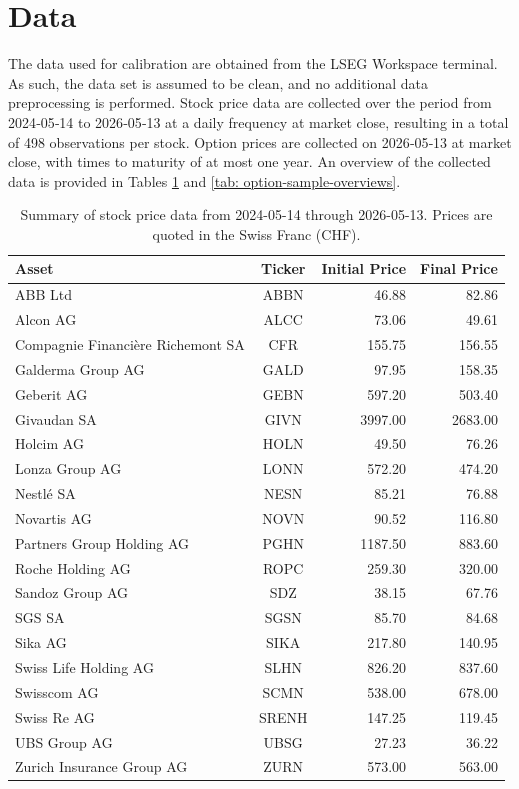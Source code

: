 \section{Data}
\label{appendix: Data}
The data used for calibration are obtained from the LSEG Workspace terminal. As such, the data set is assumed to be clean, and no additional data preprocessing is performed. Stock price data are collected over the period from 2024‑05‑14 to 2026‑05‑13 at a daily frequency at market close, resulting in a total of 498 observations per stock. Option prices are collected on 2026‑05‑13 at market close, with times to maturity of at most one year. An overview of the collected data is provided in Tables \ref{tab: stock data} and \ref{tab: option-sample-overviews}.

\begin{table}[h]
    \centering
    \begin{tabular}{lcrr}
        \toprule
        Asset & Ticker & Initial Price & Final Price \\
        \midrule
        ABB Ltd & ABBN & 46.88 & 82.86 \\
        Alcon AG & ALCC & 73.06 & 49.61 \\
        Compagnie Financière Richemont SA & CFR & 155.75 & 156.55 \\
        Galderma Group AG & GALD & 97.95 & 158.35 \\
        Geberit AG & GEBN & 597.20 & 503.40 \\
        Givaudan SA & GIVN & 3997.00 & 2683.00 \\
        Holcim AG & HOLN & 49.50 & 76.26 \\
        Lonza Group AG & LONN & 572.20 & 474.20 \\
        Nestlé SA & NESN & 85.21 & 76.88 \\
        Novartis AG & NOVN & 90.52 & 116.80 \\
        Partners Group Holding AG & PGHN & 1187.50 & 883.60 \\
        Roche Holding AG & ROPC & 259.30 & 320.00 \\
        Sandoz Group AG & SDZ & 38.15 & 67.76 \\
        SGS SA & SGSN & 85.70 & 84.68 \\
        Sika AG & SIKA & 217.80 & 140.95 \\
        Swiss Life Holding AG & SLHN & 826.20 & 837.60 \\
        Swisscom AG & SCMN & 538.00 & 678.00 \\
        Swiss Re AG & SRENH & 147.25 & 119.45 \\
        UBS Group AG & UBSG & 27.23 & 36.22 \\
        Zurich Insurance Group AG & ZURN & 573.00 & 563.00 \\
        \bottomrule
    \end{tabular}
    \caption{Summary of stock price data from 2024-05-14 through 2026-05-13. Prices are quoted in the Swiss Franc (CHF).}
    \label{tab: stock data}
\end{table}

